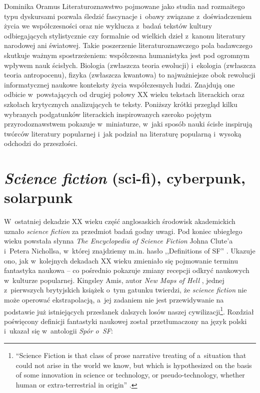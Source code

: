 \begin{artplenv}{Dominika Oramus}
\lettrine[loversize=0.13,lines=2,lraise=-0.01,nindent=0em,findent=0.2pt]%
{L}{}iteraturoznawstwo pojmowane jako studia nad rozmaitego typu dyskursami pozwala śledzić fascynacje i~obawy związane z~doświadczeniem życia we współczesności oraz nie wyklucza z~badań tekstów kultury odbiegających stylistycznie czy formalnie od wielkich dzieł z~kanonu literatury narodowej ani światowej. Takie poszerzenie literaturoznawczego pola badawczego skutkuje ważnym spostrzeżeniem: współczesna humanistyka jest pod ogromnym wpływem nauk ścisłych. Biologia (zwłaszcza teoria ewolucji) i~ekologia (zwłaszcza teoria antropocenu), fizyka (zwłaszcza kwantowa) to najważniejsze obok rewolucji informatycznej naukowe konteksty życia współczesnych ludzi. Znajdują one odbicie w~powstających od drugiej połowy XX wieku tekstach literackich oraz szkołach krytycznych analizujących te teksty. Poniższy krótki przegląd kilku wybranych podgatunków literackich inspirowanych szeroko pojętym przyrodoznawstwem pokazuje w~miniaturze, w~jaki sposób nauki ścisłe inspirują twórców literatury popularnej i~jak podział na literaturę popularną i~wysoką odchodzi do przeszłości.

\section*{\textit{Science fiction} (sci-fi), cyberpunk, solarpunk}
W~ostatniej dekadzie XX wieku część anglosaskich środowisk akademickich uznało \textit{science fiction} za przedmiot badań godny uwagi. Pod koniec ubiegłego wieku powstała słynna \textit{The Encyclopedia of Science Fiction} Johna Clute’a i~Petera Nichollsa, w~której znajdziemy m.in. hasło ,,Definitions of SF''
\parencite[][s.~311–314]{clute_encyclopedia_1993}. %
 Ukazuje ono, jak w~kolejnych dekadach XX wieku zmieniało się pojmowanie terminu fantastyka naukowa -- co pośrednio pokazuje zmiany recepcji odkryć naukowych w~kulturze popularnej. Kingsley Amis, autor \textit{New Maps of Hell} 
\parencite*[][]{amis_new_1960}, %
 jednej z~pierwszych brytyjskich książek o~tym gatunku twierdzi, że \textit{science fiction} nie może operować ekstrapolacją, a~jej zadaniem nie jest przewidywanie na podstawie już istniejących przesłanek dalszych losów naszej cywilizacji\footnote{“Science Fiction is that class of prose narrative treating of a~situation that could not arise in the world we know, but which is hypothesized on the basis of some innovation in science or technology, or pseudo-technology, whether human or extra-terrestrial in origin'' 
\parencite[][s.~14]{amis_new_1960}.%
}. Rozdział poświęcony definicji fantastyki naukowej został przetłumaczony na język polski i~ukazał się w~antologii \textit{Spór o~SF}:


\end{artplenv}

